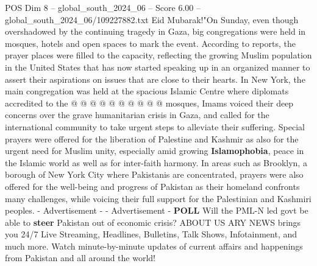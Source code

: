 \begin{textsample}{POS Dim 8 – global\_south\_2024\_06 – Score 6.00 – global\_south\_2024\_06/109227882.txt}
Eid Mubarak!"On Sunday, even though overshadowed by the continuing tragedy in Gaza, big congregations were held in mosques, hotels and open spaces to mark the event.
According to reports, the prayer places were filled to the capacity, reflecting the growing Muslim population in the United States that has now started speaking up in an organized manner to assert their aspirations on issues that are close to their hearts.
In New York, the main congregation was held at the spacious Islamic Centre where diplomats accredited to the @ @ @ @ @ @ @ @ @ @ mosques, Imams voiced their deep concerns over the grave humanitarian crisis in Gaza, and called for the international community to take urgent steps to alleviate their suffering.
Special prayers were offered for the liberation of Palestine and Kashmir as also for the urgent need for Muslim unity, especially amid growing \textbf{Islamophobia}, peace in the Islamic world as well as for inter-faith harmony.
In areas such as Brooklyn, a borough of New York City where Pakistanis are concentrated, prayers were also offered for the well-being and progress of Pakistan as their homeland confronts many challenges, while voicing their full support for the Palestinian and Kashmiri peoples. - Advertisement - - Advertisement - \textbf{POLL} Will the PML-N led govt be able to \textbf{steer} Pakistan out of economic crisis?
ABOUT US ARY NEWS brings you 24/7 Live Streaming, Headlines, Bulletins, Talk Shows, Infotainment, and much more.
Watch minute-by-minute updates of current affairs and happenings from Pakistan and all around the world!

\end{textsample}
